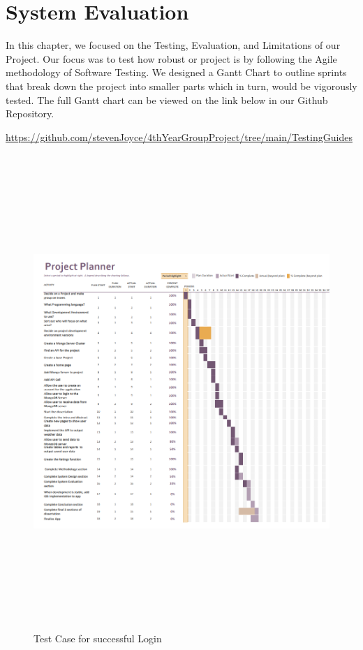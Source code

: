 \chapter{System Evaluation}
In this chapter, we focused on the Testing, Evaluation, and Limitations of our Project. Our focus was to test how robust or project is by following the Agile methodology of Software Testing. We designed a Gantt Chart to outline sprints that break down the project into smaller parts which in turn, would be vigorously tested. The full Gantt chart can be viewed on the link below in our Github Repository.
\newline

\url{https://github.com/stevenJoyce/4thYearGroupProject/tree/main/TestingGuides}

\begin{figure}[H]
    \centering
    \includegraphics[width=15cm, height = 18cm]{img/Gantt.PNG}
    \caption{Test Case for successful Login}
    \label{fig:Test Case for successful Login}
\end{figure}


